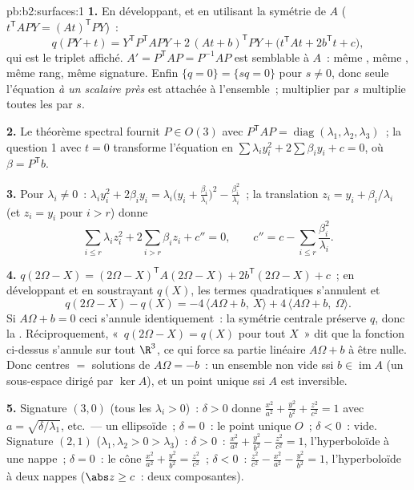 \begin{solution}{pb:b2:surfaces:1}
\textbf{1.} En développant, et en utilisant la symétrie de $A$
($t^{\mathsf T}\!APY = (At)^{\mathsf T}PY$)~:
\[
q(PY + t) = Y^{\mathsf T}P^{\mathsf T}\!APY +
2\,(At + b)^{\mathsf T}PY + \bigl(t^{\mathsf T}\!At +
2b^{\mathsf T}t + c\bigr),
\]
qui est le triplet affiché. $A' = P^{\mathsf T}\!AP =
P^{-1}AP$ est semblable à $A$~: même ,
même , même rang, même signature. Enfin $\{q = 0\} = \{sq = 0\}$
pour $s \neq 0$, donc seule l'équation \emph{à un scalaire près}
est attachée à l'ensemble~; multiplier par $s$ multiplie toutes les  par $s$.

\textbf{2.} Le théorème spectral fournit $P \in O(3)$ avec
$P^{\mathsf T}\!AP = \operatorname{diag}(\lambda_1, \lambda_2,
\lambda_3)$~; la question 1 avec $t = 0$ transforme l'équation en
$\sum\lambda_iy_i^2 + 2\sum\beta_iy_i + c = 0$, où $\beta =
P^{\mathsf T}b$.

\textbf{3.} Pour $\lambda_i \neq 0$~: $\lambda_iy_i^2 +
2\beta_iy_i = \lambda_i\bigl(y_i +
\frac{\beta_i}{\lambda_i}\bigr)^2 -
\frac{\beta_i^2}{\lambda_i}$~; la translation $z_i = y_i +
\beta_i/\lambda_i$ (et $z_i = y_i$ pour $i > r$) donne
\[
\sum_{i \leq r}\lambda_iz_i^2 + 2\sum_{i > r}\beta_iz_i +
c'' = 0, \qquad
c'' = c - \sum_{i\leq r}\frac{\beta_i^2}{\lambda_i}.
\]

\textbf{4.} $q(2\Omega - X) = (2\Omega - X)^{\mathsf T}
A(2\Omega - X) + 2b^{\mathsf T}(2\Omega - X) + c$~; en développant
et en soustrayant $q(X)$, les termes quadratiques s'annulent et
\[
q(2\Omega - X) - q(X) = -4\,\langle A\Omega + b,\ X\rangle +
4\,\langle A\Omega + b,\ \Omega\rangle .
\]
Si $A\Omega + b = 0$ ceci s'annule identiquement~: la symétrie
centrale préserve $q$, donc la . Réciproquement,
«~$q(2\Omega - X) = q(X)$ pour tout $X$~» dit que la fonction 
ci-dessus s'annule sur tout $\R^3$, ce qui force sa partie linéaire
$A\Omega + b$ à être nulle. Donc centres $=$ solutions de
$A\Omega = -b$~: un ensemble non vide ssi $b \in \operatorname{im}A$
(un sous-espace  dirigé par $\ker A$), et un point unique
ssi $A$ est inversible.

\textbf{5.} Signature $(3,0)$ (tous les $\lambda_i > 0$)~: $\delta >
0$ donne $\frac{x^2}{a^2} + \frac{y^2}{b^2} + \frac{z^2}{c^2}
= 1$ avec $a = \sqrt{\delta/\lambda_1}$, etc.\ --- un
ellipsoïde~; $\delta = 0$~: le point unique $O$~; $\delta < 0$~:
vide. Signature $(2,1)$ ($\lambda_1, \lambda_2 > 0 >
\lambda_3$)~: $\delta > 0$~: $\frac{x^2}{a^2} + \frac{y^2}{b^2}
- \frac{z^2}{c^2} = 1$, l'hyperboloïde à une nappe~; $\delta =
0$~: le cône $\frac{x^2}{a^2} + \frac{y^2}{b^2} =
\frac{z^2}{c^2}$~; $\delta < 0$~: $\frac{z^2}{c^2} -
\frac{x^2}{a^2} - \frac{y^2}{b^2} = 1$, l'hyperboloïde à deux
nappes ($\abs z \geq c$~: deux composantes).


\end{solution}
